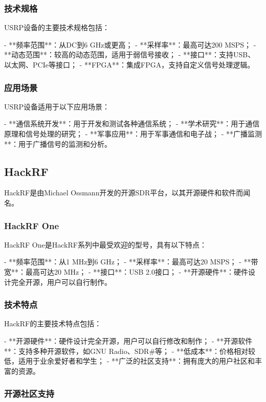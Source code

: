 ﻿\documentclass[UTF8]{ctexbook}
\begin{document}
\subsubsection{技术规格}

USRP设备的主要技术规格包括：

- **频率范围**：从DC到6 GHz或更高；
- **采样率**：最高可达200 MSPS；
- **动态范围**：较高的动态范围，适用于弱信号接收；
- **接口**：支持USB、以太网、PCIe等接口；
- **FPGA**：集成FPGA，支持自定义信号处理逻辑。

\subsubsection{应用场景}

USRP设备适用于以下应用场景：

- **通信系统开发**：用于开发和测试各种通信系统；
- **学术研究**：用于通信原理和信号处理的研究；
- **军事应用**：用于军事通信和电子战；
- **广播监测**：用于广播信号的监测和分析。

\subsection{HackRF}

HackRF是由Michael Ossmann开发的开源SDR平台，以其开源硬件和软件而闻名。

\subsubsection{HackRF One}

HackRF One是HackRF系列中最受欢迎的型号，具有以下特点：

- **频率范围**：从1 MHz到6 GHz；
- **采样率**：最高可达20 MSPS；
- **带宽**：最高可达20 MHz；
- **接口**：USB 2.0接口；
- **开源硬件**：硬件设计完全开源，用户可以自行制作。

\subsubsection{技术特点}

HackRF的主要技术特点包括：

- **开源硬件**：硬件设计完全开源，用户可以自行修改和制作；
- **开源软件**：支持多种开源软件，如GNU Radio、SDR\#等；
- **低成本**：价格相对较低，适用于业余爱好者和学生；
- **广泛的社区支持**：拥有庞大的用户社区和丰富的资源。

\subsubsection{开源社区支持}
\end{document}
